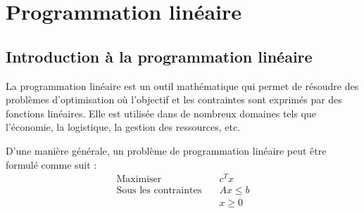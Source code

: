 \documentclass[a4paper]{article}
\begin{document}

\section{Programmation linéaire}
\label{sec:pl}

\subsection{Introduction à la programmation linéaire}
La programmation linéaire est un outil mathématique qui permet de résoudre des problèmes d'optimisation où l'objectif et les contraintes sont exprimés par des fonctions linéaires.
Elle est utilisée dans de nombreux domaines tels que l'économie, la logistique, la gestion des ressources, etc.

D'une manière générale, un problème de programmation linéaire peut être formulé comme suit :
\begin{align*}
	\text{Maximiser} \quad & c^T x \\
	\text{Sous les contraintes} \quad
	& Ax \leq b \\
	& x \geq 0
\end{align*}
\end{document}
